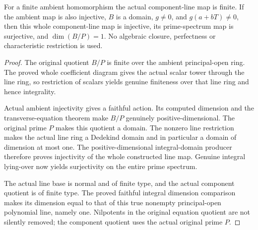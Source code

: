\begin{theorem}
\label{algebra:line-component-domination}
\leanok
{}
For a finite ambient homomorphism the actual component-line map is
finite. If the ambient map is also injective, $B$ is a domain,
$g\ne0$, and $g(a+bT)\ne0$, then this whole component-line map is
injective, its prime-spectrum map is surjective, and $\dim(B/P)=1$.
No algebraic closure, perfectness or characteristic restriction is used.
\end{theorem}
\begin{proof}
The original quotient $B/P$ is finite over the ambient principal-open
ring. The proved whole coefficient diagram gives the actual scalar
tower through the line ring, so restriction of scalars yields genuine
finiteness over that line ring and hence integrality.

Actual ambient injectivity gives a faithful action. Its computed
dimension and the transverse-equation theorem make $B/P$ genuinely
positive-dimensional. The original prime $P$ makes this quotient a
domain. The nonzero line restriction makes the actual line ring a
Dedekind domain and in particular a domain of dimension at most one.
The positive-dimensional integral-domain producer therefore proves
injectivity of the whole constructed line map. Genuine integral
lying-over now yields surjectivity on the entire prime spectrum.

The actual line base is normal and of finite type, and the actual
component quotient is of finite type. The proved faithful integral
dimension comparison makes its dimension equal to that of this true
nonempty principal-open polynomial line, namely one. Nilpotents in the
original equation quotient are not silently removed; the component
quotient uses the actual original prime $P$.
\end{proof}

